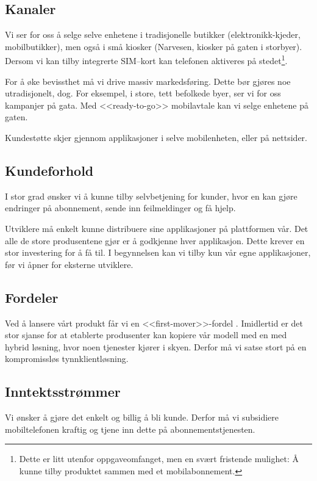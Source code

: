 \subsection{Kanaler}

Vi ser for oss å selge selve enhetene i tradisjonelle butikker
(elektronikk-kjeder, mobilbutikker), men også i små kiosker (Narvesen, kiosker
på gaten i storbyer). Dersom vi kan tilby integrerte SIM--kort kan telefonen
aktiveres på stedet\footnote{Dette er litt utenfor oppgaveomfanget, men en
svært fristende mulighet: Å kunne tilby produktet sammen med et
mobilabonnement.}.

For å øke bevissthet må vi drive massiv markedsføring. Dette bør gjøres noe
utradisjonelt, dog. For eksempel, i store, tett befolkede byer, ser vi for oss
kampanjer på gata. Med <<ready-to-go>> mobilavtale kan vi selge enhetene på
gaten.

Kundestøtte skjer gjennom applikasjoner i selve mobilenheten, eller på nettsider.

\subsection{Kundeforhold}

I stor grad ønsker vi å kunne tilby selvbetjening for kunder, hvor en kan gjøre
endringer på abonnement, sende inn feilmeldinger og få hjelp.

Utviklere må enkelt kunne distribuere sine applikasjoner på plattformen vår.  Det alle
de store produsentene gjør er å godkjenne hver applikasjon. Dette krever en stor
investering for å få til.  I begynnelsen kan vi tilby kun vår egne applikasjoner, før vi
åpner for eksterne utviklere.

\subsection{Fordeler}

Ved å lansere vårt produkt får vi en <<first-mover>>-fordel \cite{bessant}.
Imidlertid er det stor sjanse for at etablerte produsenter kan kopiere vår
modell med en med hybrid løsning, hvor noen tjenester kjører i skyen. Derfor må
vi satse stort på en kompromissløs tynnklientløsning.

\subsection{Inntektsstrømmer}

Vi ønsker å gjøre det enkelt og billig å bli kunde. Derfor må vi subsidiere
mobiltelefonen kraftig og tjene inn dette på abonnementstjenesten.

